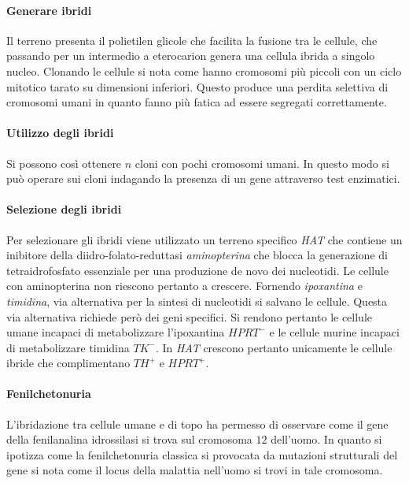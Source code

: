 			\paragraph{Generare ibridi}
			Il terreno presenta il polietilen glicole che facilita la fusione tra le cellule, che passando per un intermedio a eterocarion genera una cellula ibrida a singolo nucleo.
			Clonando le cellule si nota come hanno cromosomi pi\`u piccoli con un ciclo mitotico tarato su dimensioni inferiori.
			Questo produce una perdita selettiva di cromosomi umani in quanto fanno pi\`u fatica ad essere segregati correttamente.

			\paragraph{Utilizzo degli ibridi}
			Si possono cos\`i ottenere $n$ cloni con pochi cromosomi umani.
			In questo modo si pu\`o operare sui cloni indagando la presenza di un gene attraverso test enzimatici.

			\paragraph{Selezione degli ibridi}
			Per selezionare gli ibridi viene utilizzato un terreno specifico \emph{HAT} che contiene un inibitore della diidro-folato-reduttasi \emph{aminopterina} che blocca la generazione di tetraidrofosfato essenziale per una produzione de novo dei nucleotidi.
			Le cellule con aminopterina non riescono pertanto a crescere.
			Fornendo \emph{ipoxantina} e \emph{timidina}, via alternativa per la sintesi di nucleotidi si salvano le cellule.
			Questa via alternativa richiede per\`o dei geni specifici.
			Si rendono pertanto le cellule umane incapaci di metabolizzare l'ipoxantina \emph{$HPRT^-$} e le cellule murine incapaci di metabolizzare timidina \emph{$TK^-$}.
			In \emph{HAT} crescono pertanto unicamente le cellule ibride che complimentano \emph{$TH^+$} e \emph{$HPRT^+$}.

			\paragraph{Fenilchetonuria}
			L'ibridazione tra cellule umane e di topo ha permesso di osservare come il gene della fenilanalina idrossilasi si trova sul cromosoma $12$ dell'uomo.
			In quanto si ipotizza come la fenilchetonuria classica si provocata da mutazioni strutturali del gene si nota come il locus della malattia nell'uomo si trovi in tale cromosoma.

